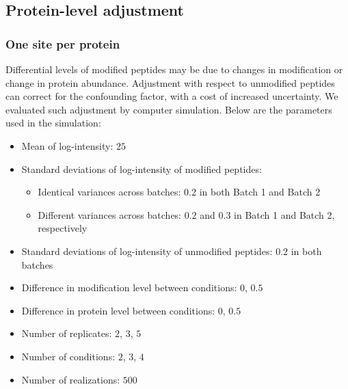 \documentclass{mcp}
\begin{document}
\clearpage
\subsection{Protein-level adjustment}

\subsubsection{One site per protein}

Differential levels of modified peptides may be due to changes in modification or change in protein abundance. Adjustment with respect to unmodified peptides can correct for the confounding factor, with a cost of increased uncertainty. We evaluated such adjustment by computer simulation. Below are the parameters used in the simulation: 
\begin{itemize}
\item Mean of log-intensity: $25$
\item Standard deviations of log-intensity of modified peptides: 
\begin{itemize}
\item Identical variances across batches: $0.2$ in both Batch 1 and Batch 2
\item Different variances across batches: $0.2$ and $0.3$ in Batch 1 and Batch 2, respectively
\end{itemize}
\item Standard deviations of log-intensity of unmodified peptides: $0.2$ in both batches
\item Difference in modification level between conditions: $0$, $0.5$
\item Difference in protein level between conditions: $0$, $0.5$
\item Number of replicates: $2$, $3$, $5$
\item Number of conditions: $2$, $3$, $4$
\item Number of realizations: $500$
\end{itemize}
\end{document}
